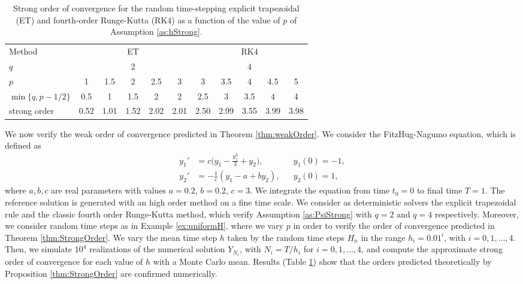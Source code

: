 \documentclass{siamart1116}
\numberwithin{theorem}{section}
\begin{document}
\begin{table}[t]
	\centering
	\begin{tabular}{lcccccccccc}
		\toprule
		Method & \multicolumn{5}{c}{ET} & \multicolumn{5}{c}{RK4} \\ 
		\cmidrule(l{2pt}r{2pt}){2-6} \cmidrule(l{2pt}r{2pt}){7-11} 
		$q$ & \multicolumn{5}{c}{2} & \multicolumn{5}{c}{4} \\
		$p$ & 1 & 1.5 & 2 & 2.5 & 3 & 3 & 3.5 & 4 & 4.5 & 5\\
		$\min\{q, p - 1/2\}$ & 0.5 & 1 & 1.5 & 2 & 2 & 2.5 & 3 & 3.5 & 4 & 4 \\
		strong order & 0.52 & 1.01 & 1.52 & 2.02 & 2.01 & 2.50 & 2.99 & 3.55 & 3.99 & 3.98 \\
		\bottomrule
	\end{tabular}
	\caption{Strong order of convergence for the random time-stepping explicit trapezoidal (ET) and fourth-order Runge-Kutta (RK4) as a function of the value of $p$ of Assumption \ref{as:hStrong}.}
	\label{tab:NumericalResultsStrongOrder}
\end{table}

We now verify the weak order of convergence predicted in Theorem \ref{thm:weakOrder}. We consider the FitzHug-Nagumo equation, which is defined as
\begin{equation}\label{eq:FitzNag}
\begin{aligned}
y_1' &= c\big(y_1 - \frac{y_1^3}{3} + y_2\big), && y_1(0) = -1, \\
y_2' &= -\frac{1}{c}(y_1 - a + by_2), && y_2(0) = 1,
\end{aligned}
\end{equation}
where $a, b, c$ are real parameters with values $a = 0.2$, $b = 0.2$, $c = 3$. We integrate the equation from time $t_0 = 0$ to final time $T = 1$. The reference solution is generated with an high order method on a fine time scale. We consider as deterministic solvers the explicit trapezoidal rule and the classic fourth order Runge-Kutta method, which verify Assumption \ref{as:PsiStrong} with $q = 2$ and $q = 4$ respectively. Moreover, we consider random time steps as in Example \ref{ex:uniformH}, where we vary $p$ in order to verify the order of convergence predicted in Theorem \ref{thm:StrongOrder}. We vary the mean time step $h$ taken by the random time steps $H_n$ in the range $h_i = 0.01^{i}$, with $i = 0, 1, \ldots, 4$. Then, we simulate $10^4$ realizations of the numerical solution $Y_{N_i}$, with $N_i = T / h_i$ for $i = 0, 1, \ldots, 4$, and compute the approximate strong order of convergence for each value of $h$ with a Monte Carlo mean. Results (Table \ref{tab:NumericalResultsStrongOrder}) show that the orders predicted theoretically by Proposition \ref{thm:StrongOrder} are confirmed numerically. 
\end{document}
